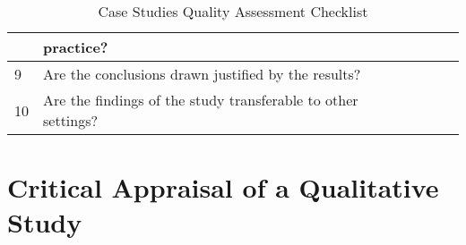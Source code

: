 \begin{table}[H]
\begin{center}
{\begin{tabular}{|l||l|l|l|l|}
                           & practice?                                                        &&& \\
                        \hline
                        9  & Are the conclusions drawn justified by the results?              &&& \\
                        \hline
                        10 & Are the findings of the study transferable to other settings?    &&& \\
                        \hline
                \end{tabular}}
        \end{center}
        \caption{Case Studies Quality Assessment Checklist}
        \label{table:caseStudy}
\end{table}
    

\section*{Critical Appraisal of a Qualitative Study}

